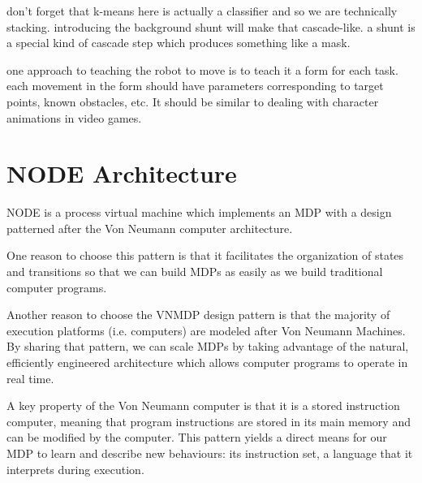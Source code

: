 \documentclass[conference]{IEEEtran}
\begin{document}

don’t forget that k-means here is actually a classifier and so we are technically stacking. 
introducing the background shunt will make that cascade-like. a shunt is a special kind of 
cascade step which produces something like a mask.

one approach to teaching the robot to move is to teach it a form for each task. 
each movement in the form should have parameters corresponding to target points, 
known obstacles, etc.  It should be similar to dealing with character animations in video games. 


\section{NODE Architecture}

NODE is a process virtual machine which implements an MDP with a design patterned
after the Von Neumann computer architecture. 

One reason to choose this pattern is that it facilitates the organization of states
and transitions so that we can build MDPs as easily as we build traditional computer programs.

Another reason to choose the VNMDP design pattern is that the majority of execution platforms
(i.e. computers) are modeled after Von Neumann Machines. By sharing that pattern,
we can scale MDPs by taking advantage of the natural, efficiently engineered architecture
which allows computer programs to operate in real time.

A key property of the Von Neumann computer is that it is a stored instruction computer,
meaning that program instructions are stored in its main memory and can be modified
by the computer.  This pattern yields a direct means for our MDP to learn and describe new
behaviours: its instruction set, a language that it interprets during execution.
\end{document}

